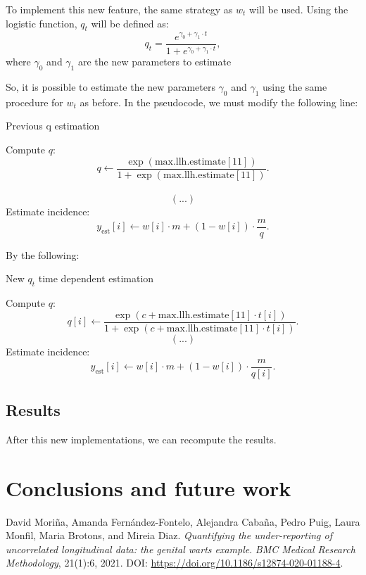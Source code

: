\documentclass[acmsmall, nonacm]{acmart}
\begin{document}
To implement this new feature, the same strategy as $w_t$ will be used. Using the logistic function, $q_t$ will be defined as:
\[
q_t = \frac{e^{\gamma_0 + \gamma_1 \cdot t}}{1 + e^{\gamma_0 + \gamma_1 \cdot t}},
\]
where $\gamma_0$ and $\gamma_1$ are the new parameters to estimate

So, it is possible to estimate the new parameters $\gamma_0$ and $\gamma_1$ using the same procedure for $w_t$ as before. In the pseudocode, we must modify the following line:
\begin{algorithm}
    \label{al:1}
    \caption{Previous q estimation}
    \begin{algorithmic}[1]
    \STATE Compute $q$:
    \[
    q \gets \frac{\exp(\text{max.llh.estimate}[11])}{1 + \exp(\text{max.llh.estimate}[11])}.
    \]
    \\
    \[(...)\]
    \STATE Estimate incidence:
        \[
        y_\text{est}[i] \gets w[i] \cdot m + (1 - w[i]) \cdot \frac{m}{q}.
        \]
    \end{algorithmic}
\end{algorithm}
By the following:
\begin{algorithm}
    \label{al:1}
    \caption{New $q_t$ time dependent estimation}
    \begin{algorithmic}[1]
    \STATE Compute $q$:
    \[
    q[i] \gets \frac{\exp(c+\text{max.llh.estimate}[11] \cdot t[i])}{1 + \exp(c+\text{max.llh.estimate}[11]\cdot t[i])}.
    \]
    \[(...)\]
    \STATE Estimate incidence:
        \[
        y_\text{est}[i] \gets w[i] \cdot m + (1 - w[i]) \cdot \frac{m}{q[i]}.
        \]
    \end{algorithmic}
\end{algorithm}
\subsection*{Results}
After this new implementations, we can recompute the results.









\section{Conclusions and future work}




\begin{thebibliography}{99}

David Moriña, Amanda Fernández-Fontelo, Alejandra Cabaña, Pedro Puig, Laura Monfil, Maria Brotons, and Mireia Diaz.
\textit{Quantifying the under-reporting of uncorrelated longitudinal data: the genital warts example}.
\textit{BMC Medical Research Methodology}, 21(1):6, 2021.
DOI: \url{https://doi.org/10.1186/s12874-020-01188-4}.

\end{thebibliography}
\end{document}
